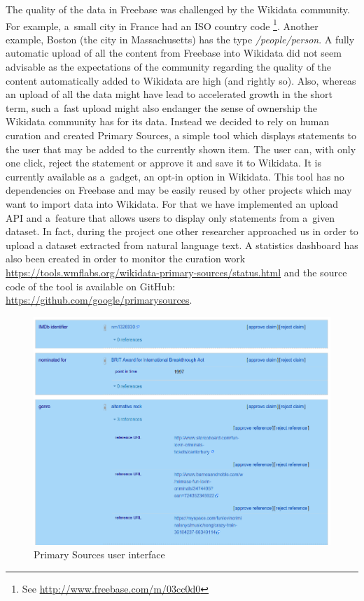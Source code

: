 \documentclass{sig-alternate}
\begin{document}
The quality of the data in Freebase was challenged by the Wikidata community.
For example, a~small city in France had an ISO country code%
\footnote{See \url{http://www.freebase.com/m/03cc0d0}}.
Another example, Boston (the city in Massachusetts) has the type \textit{/people/person}.
A fully automatic upload of all the content from Freebase into Wikidata
did not seem advisable as the expectations of the community regarding
the quality of the content automatically added to Wikidata are high (and rightly so).
Also, whereas an upload of all the data might have lead to accelerated growth
in the short term, such a~fast upload might also endanger the sense of ownership
the Wikidata community has for its data.
Instead we decided to rely on human curation and created Primary Sources,
a simple tool which displays statements to the user that may be added to the currently shown item.
The user can, with only one click, reject the statement or approve it and save it to Wikidata.
It is currently available as a~gadget, an opt-in option in Wikidata.
This tool has no dependencies on Freebase and may be easily reused by other projects
which may want to import data into Wikidata.
For that we have implemented an upload API and a~feature that allows users
to display only statements from a~given dataset.
In fact, during the project one other researcher approached us in order to upload
a dataset extracted from natural language text.
A statistics dashboard has also been created in order to monitor the curation work
\url{https://tools.wmflabs.org/wikidata-primary-sources/status.html}
and the source code of the tool is available on GitHub:
\url{https://github.com/google/primarysources}.

\begin{figure}
\centering
\includegraphics[width=8.45 cm]{img/primary-sources.png}
\caption{Primary Sources user interface}
\end{figure}
\end{document}
